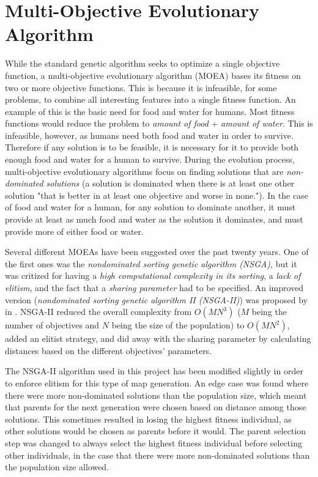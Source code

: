 \section{Multi-Objective Evolutionary Algorithm}
\label{methodology_moea}
While the standard genetic algorithm seeks to optimize a single objective function, a multi-objective evolutionary algorithm (MOEA) bases its fitness on two or more objective functions. This is because it is infeasible, for some problems, to combine all interesting features into a single fitness function. An example of this is the basic need for food and water for humans. Most fitness functions would reduce the problem to \textit{amount of food} + \textit{amount of water}. This is infeasible, however, as humans need both food and water in order to survive. Therefore if any solution is to be feasible, it is necessary for it to provide both enough food and water for a human to survive. During the evolution process, multi-objective evolutionary algorithms focus on finding solutions that are \textit{non-dominated solutions} (a solution is dominated when there is at least one other solution "that is better in at least one objective and worse in none."\cite{Togelius2013Controllable}). In the case of food and water for a human, for any solution to dominate another, it must provide at least as much food and water as the solution it dominates, and must provide more of either food or water.

Several different MOEAs have been suggested over the past twenty years\cite{Deb2001Multi, Fonseca1993Genetic, Srinivas1994Muiltiobjective}. One of the first ones was the \textit{nondominated sorting genetic algorithm (NSGA)}\cite{Srinivas1994Muiltiobjective}, but it was critized for having a \textit{high computational complexity in its sorting}, a \textit{lack of elitism}, and the fact that a \textit{sharing parameter} had to be specified. An improved version (\textit{nondominated sorting genetic algorithm II (NSGA-II)}) was proposed by \citeauthor{Deb2000Fast}\cite{Deb2000Fast} in \citeyear{Deb2000Fast}. NSGA-II reduced the overall complexity from $O(M N^3)$ ($M$ being the number of objectives and $N$ being the size of the population) to $O(M N^2)$, added an elitist strategy, and did away with the sharing parameter by calculating distances based on the different objectives' parameters.

The NSGA-II algorithm used in this project has been modified slightly in order to enforce elitism for this type of map generation. An edge case was found where there were more non-dominated solutions than the population size, which meant that parents for the next generation were chosen based on distance among those solutions. This sometimes resulted in losing the highest fitness individual, as other solutions would be chosen as parents before it would. The parent selection step was changed to always select the highest fitness individual before selecting other individuals, in the case that there were more non-dominated solutions than the population size allowed.

